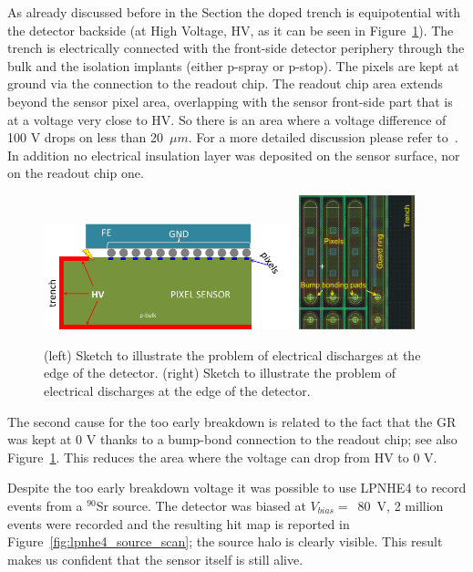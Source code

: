As already discussed before in the Section the doped trench is equipotential with the detector backside (at High Voltage, HV, as it can be seen in Figure~\ref{fig:sparks}). The trench is electrically connected with the front-side detector periphery through the bulk 
and the isolation implants (either p-spray or p-stop). The pixels are kept at ground via the connection to the readout chip. The readout chip area extends beyond the sensor pixel area, overlapping with the sensor front-side part that is at a voltage very close to HV. So there is an area 
where a voltage difference of 100 V drops on less than 20~$\mu m$. For a more detailed discussion please refer to~\cite{rossi2006pixel}. In addition no electrical insulation layer was deposited on the sensor 
surface, nor on the readout chip one.
\begin{figure}[!htb]
\centering
\includegraphics[width=0.65\textwidth]{sparks.png}
\includegraphics[width=0.3\textwidth]{bbs_over_gr.png}
\caption{\label{fig:sparks}(left) Sketch to illustrate the problem of electrical discharges at the edge of the detector. (right) Sketch to illustrate the problem of electrical discharges at the edge of the detector.}
\end{figure}
The second cause for the too early breakdown is related to the fact that 
the GR was kept at 0 V thanks to a bump-bond connection to the 
readout chip; see also Figure~\ref{fig:sparks}. This reduces the area where the voltage can drop from HV to 0 V. 




Despite the too early breakdown voltage it was possible to use LPNHE4 to record events from a  $^{90}$Sr source. The detector was biased at  
$V_{bias} = $~80~V, 2 million events were recorded and the resulting 
hit map is reported in Figure~\ref{fig:lpnhe4_source_scan}; the source halo is clearly visible. This result makes us confident that the sensor itself is still alive.

